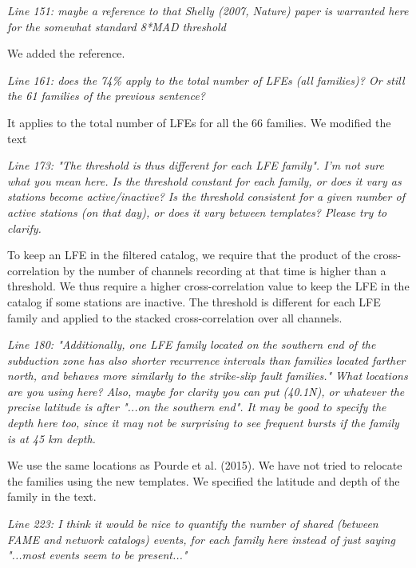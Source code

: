 \documentclass[letterpaper, 12pt]{article}
\begin{document}
\textit{Line 151: maybe a reference to that Shelly (2007, Nature) paper is warranted here for the somewhat standard 8*MAD threshold}

\bigskip

We added the reference.

\bigskip

\textit{Line 161: does the 74\% apply to the total number of LFEs (all families)? Or still the 61 families of the previous sentence?}

\bigskip

It applies to the total number of LFEs for all the 66 families. We modified the text

\bigskip

\textit{Line 173: "The threshold is thus different for each LFE family". I'm not sure what you mean here. Is the threshold constant for each family, or does it vary as stations become active/inactive? Is the threshold consistent for a given number of active stations (on that day), or does it vary between templates? Please try to clarify.}

\bigskip

To keep an LFE in the filtered catalog, we require that the product of the cross-correlation by the number of channels recording at that time is higher than a threshold. We thus require a higher cross-correlation value to keep the LFE in the catalog if some stations are inactive. The threshold is different for each LFE family and applied to the stacked cross-correlation over all channels.

\bigskip

\textit{Line 180: "Additionally, one LFE family located on the southern end of the subduction zone has also shorter recurrence intervals than families located farther north, and behaves more similarly to the strike-slip fault families." What locations are you using here? Also, maybe for clarity you can put (40.1N), or whatever the precise latitude is after "...on the southern end". It may be good to specify the depth here too, since it may not be surprising to see frequent bursts if the family is at 45 km depth.}

\bigskip

We use the same locations as Pourde et al. (2015). We have not tried to relocate the families using the new templates. We specified the latitude and depth of the family in the text.

\bigskip

\textit{Line 223: I think it would be nice to quantify the number of shared (between FAME and network catalogs) events, for each family here instead of just saying "...most events seem to be present..."}
\end{document}
